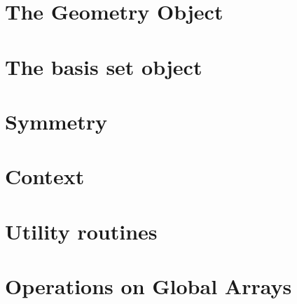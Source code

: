\chapter{The Geometry Object}


\chapter{The basis set object}


\chapter{Symmetry}


\chapter{Context}


\chapter{Utility routines}


\chapter{Operations on Global Arrays}


 

